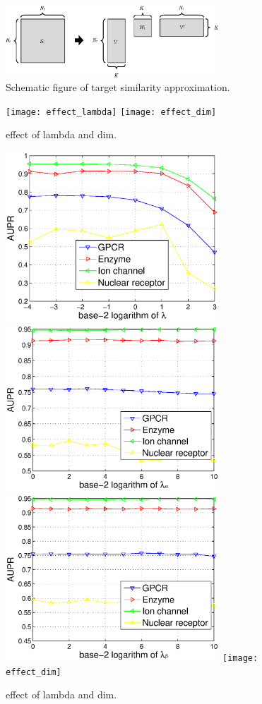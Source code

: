 \documentclass{article}
\begin{document}
\begin{figure} [htbp]
\centering
\includegraphics[width=8cm]{fig_tmf_sim_target_new}
\caption{Schematic figure of target similarity approximation.}\label{fig_tmf_sim_target}
\end{figure}

\begin{figure} [htbp]
\centering
\texttt{[image: effect\_lambda]}
\texttt{[image: effect\_dim]}
\caption{effect of lambda and dim.}\label{effect_lambda_dim}
\end{figure}

\begin{figure} [htbp]
\centering
\includegraphics[width=8cm]{mstmf_w_effect_lambda}
\includegraphics[width=8cm]{mstmf_w_effect_lambdaA}
\includegraphics[width=8cm]{mstmf_w_effect_lambdaB}
\texttt{[image: effect\_dim]}
\caption{effect of lambda and dim.}\label{effect_lambda_dim}
\end{figure}
\end{document}
